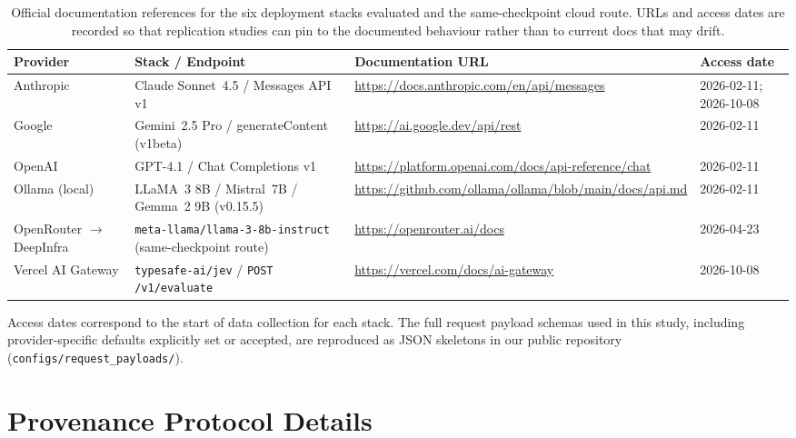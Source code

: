 \documentclass[11pt]{article}
\newenvironment{fittab}{\begin{lrbox}{\fittabbox}}{\end{lrbox}%
  \ifdim\wd\fittabbox>\linewidth\resizebox{\linewidth}{!}{\usebox{\fittabbox}}\else\usebox{\fittabbox}\fi}
\begin{document}
\begin{table}[htbp]
\centering
\caption{Official documentation references for the six deployment stacks evaluated and the same-checkpoint cloud route. URLs and access dates are recorded so that replication studies can pin to the documented behaviour rather than to current docs that may drift.}
\label{tab:apidocs}
\small
\begin{fittab}\begin{tabular}{p{2.6cm}p{2.8cm}p{6.2cm}p{1.6cm}}
\toprule
\textbf{Provider} & \textbf{Stack / Endpoint} & \textbf{Documentation URL} & \textbf{Access date} \\
\midrule
Anthropic   & Claude Sonnet~4.5 / Messages API v1            & \url{https://docs.anthropic.com/en/api/messages} & 2026-02-11; 2026-10-08 \\
Google      & Gemini~2.5 Pro / generateContent (v1beta)          & \url{https://ai.google.dev/api/rest}              & 2026-02-11 \\
OpenAI      & GPT-4.1 / Chat Completions v1                  & \url{https://platform.openai.com/docs/api-reference/chat} & 2026-02-11 \\
Ollama (local) & LLaMA~3 8B / Mistral~7B / Gemma~2 9B (v0.15.5) & \url{https://github.com/ollama/ollama/blob/main/docs/api.md} & 2026-02-11 \\
OpenRouter $\rightarrow$ DeepInfra & \texttt{meta-llama/\allowbreak llama-3-\allowbreak 8b-\allowbreak instruct} (same-checkpoint route) & \url{https://openrouter.ai/docs} & 2026-04-23 \\
Vercel AI Gateway & \texttt{typesafe-ai/jev} / \texttt{POST /v1/evaluate} & \url{https://vercel.com/docs/ai-gateway} & 2026-10-08 \\
\bottomrule
\end{tabular}\end{fittab}
\end{table}

\noindent Access dates correspond to the start of data collection for each stack.
The full request payload schemas used in this study, including provider-specific defaults explicitly set or accepted, are reproduced as JSON skeletons in our public repository (\texttt{configs/request\_payloads/}).

\section{Provenance Protocol Details}
\label{sec:provenance}
\end{document}
